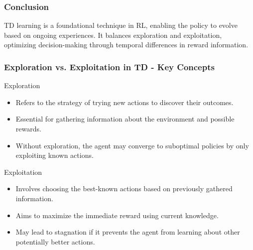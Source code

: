 \documentclass[aspectratio=169]{beamer}
\begin{document}
\begin{frame}[fragile]
    \frametitle{Conclusion}
    TD learning is a foundational technique in RL, enabling the policy to evolve based on ongoing experiences. It balances exploration and exploitation, optimizing decision-making through temporal differences in reward information.
\end{frame}

\begin{frame}[fragile]
    \frametitle{Exploration vs. Exploitation in TD - Key Concepts}
    \begin{block}{Exploration}
        \begin{itemize}
            \item Refers to the strategy of trying new actions to discover their outcomes.
            \item Essential for gathering information about the environment and possible rewards.
            \item Without exploration, the agent may converge to suboptimal policies by only exploiting known actions.
        \end{itemize}
    \end{block}
    
    \begin{block}{Exploitation}
        \begin{itemize}
            \item Involves choosing the best-known actions based on previously gathered information.
            \item Aims to maximize the immediate reward using current knowledge.
            \item May lead to stagnation if it prevents the agent from learning about other potentially better actions.
        \end{itemize}
    \end{block}
\end{frame}
\end{document}
